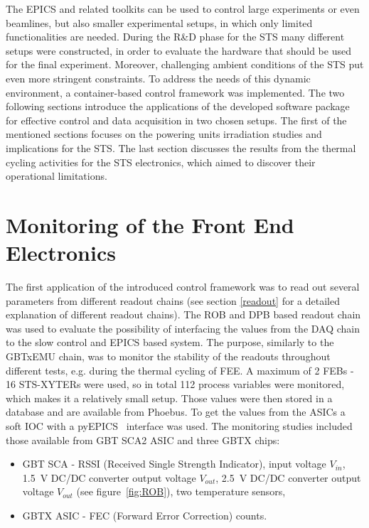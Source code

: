 The \gls{EPICS} and related toolkits can be used to control large experiments or even beamlines, but also smaller experimental setups, in which only limited functionalities are needed. During the R\&D phase for the \gls{STS} many different setups were constructed, in order to evaluate the hardware that should be used for the final experiment. Moreover, challenging ambient conditions of the \gls{STS} put even more stringent constraints. To address the needs of this dynamic environment, a container-based control framework was implemented. 
The two following sections introduce the applications of the developed software package for effective control and data acquisition in two chosen setups. The first of the mentioned sections focuses on the powering units irradiation studies and implications for the \gls{STS}. The last section discusses the results from the thermal cycling activities for the \gls{STS} electronics, which aimed to discover their operational limitations. 

\section{Monitoring of the Front End Electronics}
The first application of the introduced control framework was to read out several parameters from different readout chains (see section \ref{readout} for a detailed explanation of different readout chains). The \gls{ROB} and \gls{DPB} based readout chain was used to evaluate the possibility of interfacing the values from the \gls{DAQ} chain to the slow control and \gls{EPICS} based system. The purpose, similarly to the GBTxEMU chain, was to monitor the stability of the readouts throughout different tests, e.g. during the thermal cycling of \gls{FEE}. A maximum of 2 \glspl{FEB} - 16 STS-XYTERs were used, so in total 112 process variables were monitored, which makes it a relatively small setup. Those values were then stored in a database and are available from Phoebus. 
To get the values from the \glspl{ASIC} a soft \gls{IOC} with a pyEPICS~\cite{pyEPICS} interface was used. The monitoring studies included those available from \gls{GBT} \gls{SCA2} \gls{ASIC} \cite{GBT_SCA_ASIC} and three GBTX chips: 
\begin{itemize}
    \item GBT SCA - RSSI (Received Single Strength Indicator), input voltage $V_{in}$, 1.5~V DC/DC converter output voltage $V_{out}$, 2.5~V DC/DC converter output voltage $V_{out}$ (see figure~\ref{fig:ROB}), two temperature sensors,
    \item GBTX \gls{ASIC} - FEC (Forward Error Correction) counts.
\end{itemize}

